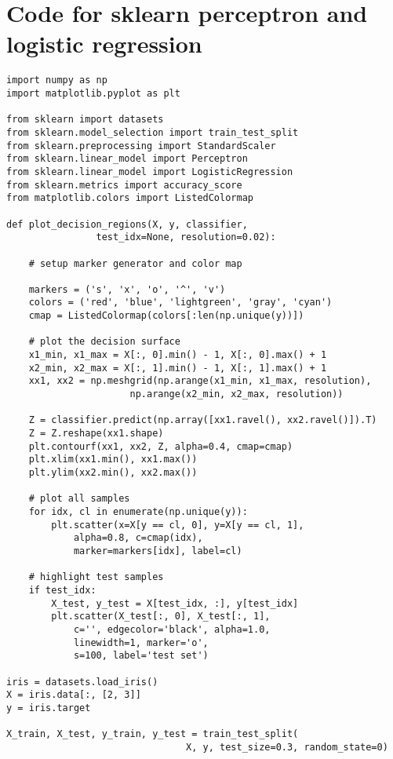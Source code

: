 \documentclass[12pt]{article}
\begin{document}
\section{Code for sklearn perceptron and logistic regression}
\begin{verbatim}
import numpy as np 
import matplotlib.pyplot as plt

from sklearn import datasets 
from sklearn.model_selection import train_test_split
from sklearn.preprocessing import StandardScaler
from sklearn.linear_model import Perceptron
from sklearn.linear_model import LogisticRegression
from sklearn.metrics import accuracy_score
from matplotlib.colors import ListedColormap

def plot_decision_regions(X, y, classifier,                     
                test_idx=None, resolution=0.02):    
    
    # setup marker generator and color map

    markers = ('s', 'x', 'o', '^', 'v')    
    colors = ('red', 'blue', 'lightgreen', 'gray', 'cyan')    
    cmap = ListedColormap(colors[:len(np.unique(y))])    
    
    # plot the decision surface    
    x1_min, x1_max = X[:, 0].min() - 1, X[:, 0].max() + 1    
    x2_min, x2_max = X[:, 1].min() - 1, X[:, 1].max() + 1    
    xx1, xx2 = np.meshgrid(np.arange(x1_min, x1_max, resolution),       
                      np.arange(x2_min, x2_max, resolution))    
                      
    Z = classifier.predict(np.array([xx1.ravel(), xx2.ravel()]).T)    
    Z = Z.reshape(xx1.shape)    
    plt.contourf(xx1, xx2, Z, alpha=0.4, cmap=cmap)    
    plt.xlim(xx1.min(), xx1.max())    
    plt.ylim(xx2.min(), xx2.max())    
    
    # plot all samples    
    for idx, cl in enumerate(np.unique(y)):        
        plt.scatter(x=X[y == cl, 0], y=X[y == cl, 1],                    
            alpha=0.8, c=cmap(idx),                    
            marker=markers[idx], label=cl)

    # highlight test samples    
    if test_idx:        
        X_test, y_test = X[test_idx, :], y[test_idx]           
        plt.scatter(X_test[:, 0], X_test[:, 1], 
            c='', edgecolor='black', alpha=1.0, 
            linewidth=1, marker='o',                 
            s=100, label='test set')

iris = datasets.load_iris()
X = iris.data[:, [2, 3]]
y = iris.target

X_train, X_test, y_train, y_test = train_test_split(
                                X, y, test_size=0.3, random_state=0)


\end{verbatim}
\end{document}
